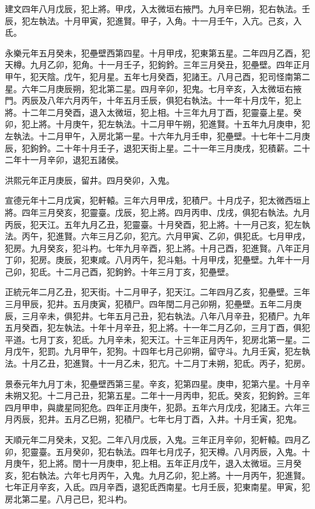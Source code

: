 \begin{pinyinscope}
建文四年八月戊辰，犯上將。甲戌，入太微垣右掖門。九月辛巳朔，犯右執法。壬辰，犯左執法。十月甲寅，犯進賢。甲子，入角。十一月壬午，入亢。己亥，入氐。

永樂元年五月癸未，犯壘壁西第四星。十月甲戌，犯東第五星。二年四月乙酉，犯天樽。九月乙卯，犯角。十一月壬子，犯鉤鈐。三年三月癸丑，犯壘壁。四年正月甲午，犯天陰。戊午，犯月星。五年七月癸酉，犯諸王。八月己酉，犯司怪南第二星。六年二月庚辰朔，犯北第二星。四月辛卯，犯鬼。七月辛亥，入太微垣右掖門。丙辰及八年六月丙午，十年五月壬辰，俱犯右執法。十一年十月戊午，犯上將。十二年二月癸酉，退入太微垣，犯上相。十三年九月丁酉，犯靈臺上星。癸卯，犯上將。十月庚午，犯左執法。十二月甲午朔，犯進賢。十五年九月庚申，犯左執法。十二月甲午，入房北第一星。十六年九月壬申，犯壘壁。十七年十二月庚辰，犯鉤鈐。二十年十月壬子，退犯天街上星。二十一年三月庚戌，犯積薪。二十二年十一月辛卯，退犯五諸侯。

洪熙元年正月庚辰，留井。四月癸卯，入鬼。

宣德元年十二月戊寅，犯軒轅。三年六月甲戌，犯積尸。十月戊子，犯太微西垣上將。四年三月癸亥，犯靈臺。戊辰，犯上將。四月丙申、戊戌，俱犯右執法。九月丙辰，犯天江。五年九月乙丑，犯靈臺。十月癸酉，犯上將。十一月己亥，犯左執法。丙午，犯進賢。六年三月乙卯，犯亢。六月甲寅、乙卯，俱犯氐。七月甲戌，犯房。九月癸亥，犯斗杓。七年九月辛酉，犯上將。十月己酉，犯進賢。八年正月丁卯，犯房。庚辰，犯東咸。八月丙午，犯斗魁。十月甲戌，犯壘壁。九年十一月己卯，犯氐。十二月己酉，犯鉤鈐。十年三月丁亥，犯壘壁。

正統元年二月乙丑，犯天街。十二月甲子，犯天江。二年四月乙亥，犯壘壁。三年三月甲辰，犯井。五月庚寅，犯積尸。四年閏二月己卯朔，犯壘壁。五年二月庚辰，三月辛未，俱犯井。七年五月己丑，犯右執法。八年八月辛丑，犯積尸。九年五月癸酉，犯左執法。十年十月辛丑，犯上將。十一年二月乙卯，三月丁酉，俱犯平道。七月丁亥，犯氐。九月辛未，犯天江。十三年正月丙午，犯房北第一星。二月戊午，犯罰。九月甲午，犯狗。十四年七月己卯朔，留守斗。九月壬寅，犯左執法。十月乙丑，犯進賢。十一月乙未，犯亢。十二月丁未朔，犯氐。丙子，犯房。

景泰元年九月丁未，犯壘壁西第三星。辛亥，犯第四星。庚申，犯第六星。十月辛未朔又犯。十二月己丑，犯第五星。二年十一月丙申，犯氐。癸亥，犯鉤鈐。三年四月甲申，與歲星同犯危。四年正月庚午，犯昴。五年六月戊戌，犯諸王。六年三月丙辰，犯井。五月乙巳朔，犯積尸。七年七月丁酉，入井。十月壬寅，犯鬼。

天順元年二月癸未，又犯。二年八月戊辰，入鬼。三年正月辛卯，犯軒轅。四月乙卯，犯靈臺。五月癸卯，犯右執法。四年七月戊子，犯天樽。八月丙辰，入鬼。十月庚午，犯上將。閏十一月庚申，犯上相。五年正月戊午，退入太微垣。三月癸亥，犯右執法。六年七月丙午，入鬼。九月乙卯，犯上將。十一月丙午，犯進賢。七年正月辛亥，入氐。四月辛酉，退犯氐西南星。七月壬辰，犯東南星。甲寅，犯房北第二星。八月己巳，犯斗杓。


\end{pinyinscope}
